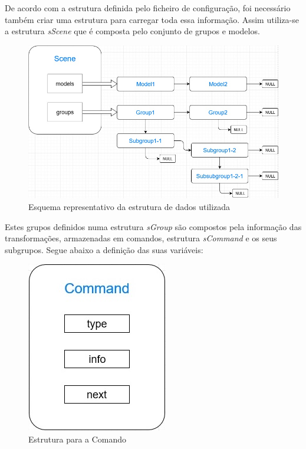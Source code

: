 De acordo com a estrutura definida pelo ficheiro de configuração, foi necessário também criar uma estrutura para carregar toda essa informação.  Assim utiliza-se a estrutura \textit{sScene }que é composta pelo conjunto de grupos e modelos. 

\begin{figure}[htpb]
	\centering
	\includegraphics[scale=0.5]{imagens/structureComplete.jpg}
	\caption{Esquema representativo da estrutura de dados utilizada}
	\label{p1:fig:p1_estrutura}
\end{figure}


Estes grupos definidos numa estrutura \textit{sGroup} são compostos pela informação das transformações, armazenadas em comandos, estrutura \textit{sCommand} e os seus subgrupos. 
Segue abaixo a definição das suas variáveis:


\begin{figure}[htpb]
	\centering
	\includegraphics[scale=0.5]{imagens/structureCommand.jpg}
	\caption{Estrutura para a Comando}
	\label{p1:fig:p1_estruturacomando}
\end{figure}

